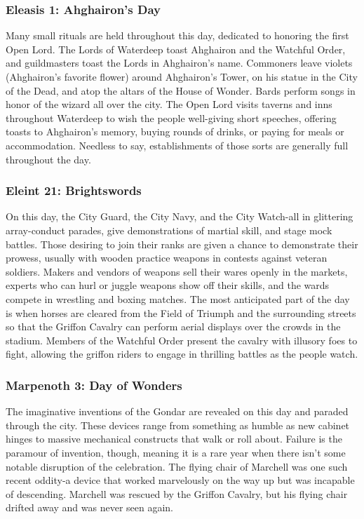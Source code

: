 \documentclass[10pt,a4paper,twoside,twocolumn,openany,nodeprecatedcode]{dndbook}
\begin{document}
\subsubsection{Eleasis 1: Ahghairon's Day}
Many small rituals are held throughout this day, dedicated to honoring the first Open Lord. The Lords of Waterdeep toast Ahghairon and the Watchful Order, and guildmasters toast the Lords in Ahghairon's name. Commoners leave violets (Ahghairon's favorite flower) around Ahghairon's Tower, on his statue in the City of the Dead, and atop the altars of the House of Wonder. Bards perform songs in honor of the wizard all over the city. The Open Lord visits taverns and inns throughout Waterdeep to wish the people well-giving short speeches, offering toasts to Ahghairon's memory, buying rounds of drinks, or paying for meals or accommodation. Needless to say, establishments of those sorts are generally full throughout the day.
\subsubsection{Eleint 21: Brightswords}
On this day, the City Guard, the City Navy, and the City Watch-all in glittering array-conduct parades, give demonstrations of martial skill, and stage mock battles. Those desiring to join their ranks are given a chance to demonstrate their prowess, usually with wooden practice weapons in contests against veteran soldiers. Makers and vendors of weapons sell their wares openly in the markets, experts who can hurl or juggle weapons show off their skills, and the wards compete in wrestling and boxing matches. The most anticipated part of the day is when horses are cleared from the Field of Triumph and the surrounding streets so that the Griffon Cavalry can perform aerial displays over the crowds in the stadium. Members of the Watchful Order present the cavalry with illusory foes to fight, allowing the griffon riders to engage in thrilling battles as the people watch.
\subsubsection{Marpenoth 3: Day of Wonders}
The imaginative inventions of the Gondar are revealed on this day and paraded through the city. These devices range from something as humble as new cabinet hinges to massive mechanical constructs that walk or roll about. Failure is the paramour of invention, though, meaning it is a rare year when there isn't some notable disruption of the celebration. The flying chair of Marchell was one such recent oddity-a device that worked marvelously on the way up but was incapable of descending. Marchell was rescued by the Griffon Cavalry, but his flying chair drifted away and was never seen again.
\end{document}
